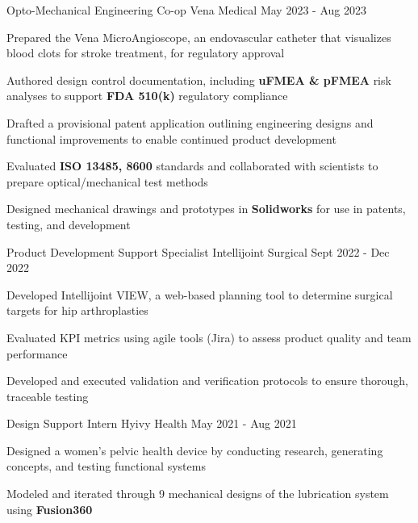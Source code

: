 \documentclass[11pt, a4paper]{russell}
\begin{document}
\begin{cventries}
\cventry
  {Opto-Mechanical Engineering Co-op} %
  {Vena Medical} %
  {} %
  {May 2023 - Aug 2023} %
  {
    \begin{cvitems}
        \item {Prepared the Vena MicroAngioscope, an endovascular catheter that visualizes blood clots for stroke treatment, for regulatory approval}
        \item {Authored design control documentation, including\textbf{ uFMEA \& pFMEA} risk analyses to support \textbf{FDA 510(k)} regulatory compliance}
        \item {Drafted a provisional patent application outlining engineering designs and functional improvements to enable continued product development}
        \item {Evaluated \textbf{ISO 13485, 8600} standards and collaborated with scientists to prepare optical/mechanical test methods}
        \item {Designed mechanical drawings and prototypes in \textbf{Solidworks} for use in patents, testing, and development}
    \end{cvitems}
  }

\cventry
  {Product Development Support Specialist} %
  {Intellijoint Surgical} %
  {} %
  {Sept 2022 - Dec 2022} %
  {
    \begin{cvitems}
        \item {Developed Intellijoint VIEW, a web-based planning tool to determine surgical targets for hip arthroplasties}
        \item {Evaluated KPI metrics using agile tools (Jira) to assess product quality and team performance}
        \item {Developed and executed validation and verification protocols to ensure thorough, traceable testing}
    \end{cvitems}
  }

\cventry
  {Design Support Intern} %
  {Hyivy Health} %
  {} %
  {May 2021 - Aug 2021} %
  {
    \begin{cvitems}
        \item {Designed a women's pelvic health device by conducting research, generating concepts, and testing functional systems}
        \item {Modeled and iterated through 9 mechanical designs of the lubrication system using \textbf{Fusion360}}
    \end{cvitems}
  }
\end{cventries}
\end{document}
